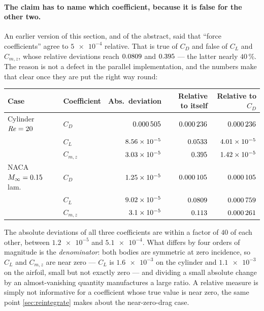 \paragraph{The claim has to name which coefficient, because it is false for the other two.}
An earlier version of this section, and of the abstract, said that ``force coefficients''
agree to $\num{5e-4}$ relative. That is true of $C_D$ and false of $C_L$ and $C_{m,z}$,
whose relative deviations reach $\num{0.0809}$ and
$\num{0.395}$ --- the latter nearly $40\,\%$. The reason is not a defect in
the parallel implementation, and the numbers make that clear once they are put the right
way round:

\begin{center}
\begin{tabular}{llrrr}
  \toprule
  Case & Coefficient & Abs.\ deviation & Relative to itself & Relative to $C_D$ \\
  \midrule
  Cylinder $\mathit{Re}=20$ & $C_D$ & $\num{0.000505}$
    & $\num{0.000236}$ & $\num{0.000236}$ \\
   & $C_L$ & $\num{8.56e-05}$
    & $\num{0.0533}$ & $\num{4.01e-05}$ \\
   & $C_{m,z}$ & $\num{3.03e-05}$
    & $\mathbf{\num{0.395}}$ & $\num{1.42e-05}$ \\
  \midrule
  NACA $M_\infty=0.15$ lam. & $C_D$ & $\num{1.25e-05}$
    & $\num{0.000105}$ & $\num{0.000105}$ \\
   & $C_L$ & $\num{9.02e-05}$
    & $\mathbf{\num{0.0809}}$ & $\num{0.000759}$ \\
   & $C_{m,z}$ & $\num{3.1e-05}$
    & $\num{0.113}$ & $\num{0.000261}$ \\
  \bottomrule
\end{tabular}
\end{center}

\noindent The absolute deviations of all three coefficients are within a factor of
$40$ of each other, between $\num{1.2e-5}$ and $\num{5.1e-4}$. What differs by four orders
of magnitude is the \emph{denominator}: both bodies are symmetric at zero incidence, so
$C_L$ and $C_{m,z}$ are near zero --- $C_L$ is $\num{1.6e-3}$ on the cylinder and
$\num{1.1e-3}$ on the airfoil, small but not exactly zero --- and dividing a small absolute
change by an almost-vanishing quantity manufactures a large ratio. A relative measure is
simply not informative for a coefficient whose true value is near zero, the same point
\cref{sec:reintegrate} makes about the near-zero-drag case.

